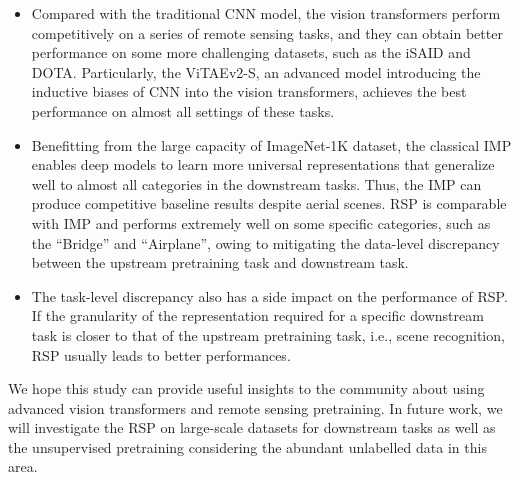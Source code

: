 \documentclass[10pt, journal,twoside]{IEEEtran}
\begin{document}
\begin{itemize}
  \item Compared with the traditional CNN model, the vision transformers perform competitively on a series of remote sensing tasks, and they can obtain better performance on some more challenging datasets, such as the iSAID and DOTA. Particularly, the ViTAEv2-S, an advanced model introducing the inductive biases of CNN into the vision transformers, achieves the best performance on almost all settings of these tasks.
  \item Benefitting from the large capacity of ImageNet-1K dataset, the classical IMP enables deep models to learn more universal representations that generalize well to almost all categories in the downstream tasks. Thus, the IMP can produce competitive baseline results despite aerial scenes. RSP is comparable with IMP and performs extremely well on some specific categories, such as the ``Bridge'' and ``Airplane'', owing to mitigating the data-level discrepancy between the upstream pretraining task and downstream task.
  \item The task-level discrepancy also has a side impact on the performance of RSP. If the granularity of the representation required for a specific downstream task is closer to that of the upstream pretraining task, i.e., scene recognition, RSP usually leads to better performances.

\end{itemize}

We hope this study can provide useful insights to the community about using advanced vision transformers and remote sensing pretraining. In future work, we will investigate the RSP on large-scale datasets for downstream tasks as well as the unsupervised pretraining considering the abundant unlabelled data in this area.















































\ifCLASSOPTIONcaptionsoff
  \newpage
\fi









\end{document}
